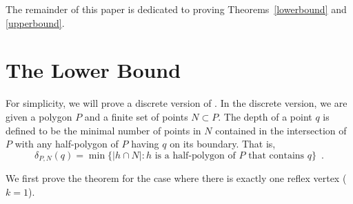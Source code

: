 \documentclass{article}
\begin{document}
The remainder of this paper is dedicated to proving
Theorems~\ref{lowerbound} and \ref{upperbound}.

\section{The Lower Bound}

For simplicity, we will prove a discrete version of
.  In the discrete version, we are given a polygon
$P$ and a finite set of points $N \subset P$. The depth of a point $q$
is defined to be the minimal number of points in $N$ contained in the
intersection of $P$ with any half-polygon of $P$ having $q$ on its
boundary.  That is, 
\[
     \delta_{P,N}(q) = \min\{|h\cap N| : \mbox{$h$ is a half-polygon
	of $P$ that contains $q$} \} \enspace .
\]

We first prove the theorem for the case where there is exactly one
reflex vertex ($k=1$).
\end{document}

